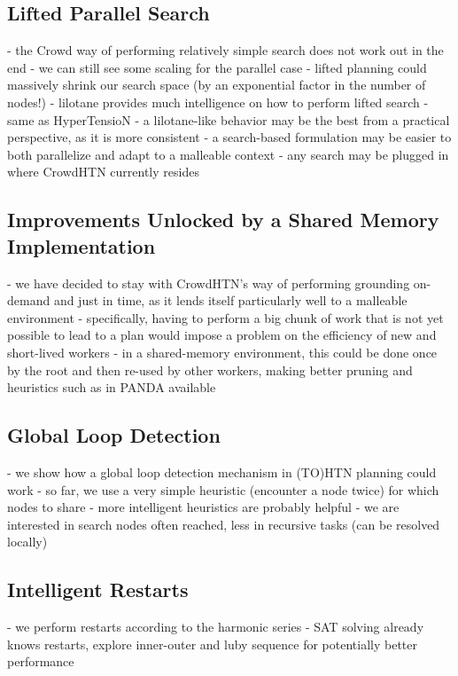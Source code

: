 \subsection{Lifted Parallel Search}
- the Crowd way of performing relatively simple search does not work out in the end
- we can still see some scaling for the parallel case
- lifted planning could massively shrink our search space (by an exponential factor in the number of nodes!)
- lilotane provides much intelligence on how to perform lifted search
- same as HyperTensioN
- a lilotane-like behavior may be the best from a practical perspective, as it is more consistent
- a search-based formulation may be easier to both parallelize and adapt to a malleable context - any search may be plugged in where CrowdHTN currently resides

\subsection{Improvements Unlocked by a Shared Memory Implementation}
- we have decided to stay with CrowdHTN's way of performing grounding on-demand and just in time, as it lends itself particularly well to a malleable environment
- specifically, having to perform a big chunk of work that is not yet possible to lead to a plan would impose a problem on the efficiency of new and short-lived workers
- in a shared-memory environment, this could be done once by the root and then re-used by other workers, making better pruning and heuristics such as in PANDA available

\subsection{Global Loop Detection}
- we show how a global loop detection mechanism in (TO)HTN planning could work
- so far, we use a very simple heuristic (encounter a node twice) for which nodes to share
- more intelligent heuristics are probably helpful
- we are interested in search nodes often reached, less in recursive tasks (can be resolved locally)

\subsection{Intelligent Restarts}
- we perform restarts according to the harmonic series
- SAT solving already knows restarts, explore inner-outer and luby sequence for potentially better performance
